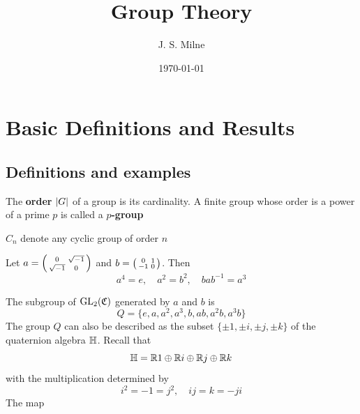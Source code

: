 \documentclass[11pt]{article}
\author{J. S. Milne}
\date{\today}
\title{Group Theory}
\begin{document}
\maketitle
\tableofcontents

\section{Basic Definitions and Results}
\label{sec:org36537d2}
\subsection{Definitions and examples}
\label{sec:org262b012}
The \textbf{order} \(\abs{G}\) of a group is its cardinality. A finite group whose order is a power of a
prime \(p\) is called a \textbf{\(p\)-group}

\(C_n\) denote any cyclic group of order \(n\)

\begin{examplle}
Let \(a=\begin{psmallmatrix}0&\sqrt{-1}\\\sqrt{-1}&0\end{psmallmatrix}\)
and \(b=\begin{psmallmatrix}0&1\\-1&0\end{psmallmatrix}\). Then
\begin{equation*}
a^4=e,\quad a^2=b^2,\quad bab^{-1}=a^3
\end{equation*}

The subgroup of \(\operatorname{GL}_2(\mathfrak{C})\) generated by \(a\) and \(b\) is
\begin{equation*}
Q=\{e,a,a^2,a^3,b,ab,a^2b,a^3b\}
\end{equation*}
The group \(Q\) can also be described as the subset \(\{\pm 1,\pm i,\pm j,\pm k\}\) of the quaternion
algebra \(\mathbb{H}\). Recall that
\begin{equation*}
\mathbb{H}=\mathbb{R} 1\oplus\mathbb{R} i\oplus\mathbb{R} j\oplus\mathbb{R} k
\end{equation*}
with the multiplication determined by
\begin{equation*}
i^2=-1=j^2,\quad ij=k=-ji
\end{equation*}
The map
\end{examplle}
\end{document}
